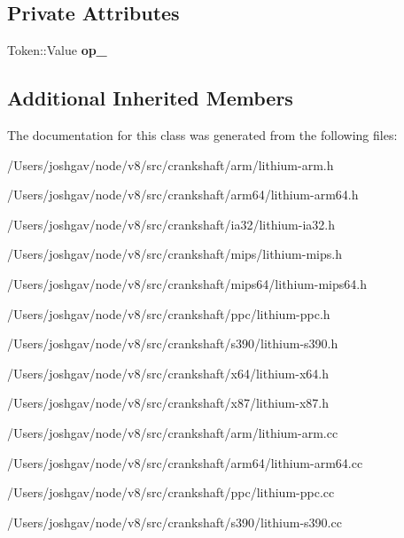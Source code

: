 \subsection*{Private Attributes}
\begin{DoxyCompactItemize}
\item 
Token\+::\+Value {\bfseries op\+\_\+}\hypertarget{classv8_1_1internal_1_1_l_arithmetic_d_a50480ec743e9f2894fcec9a92517219c}{}\label{classv8_1_1internal_1_1_l_arithmetic_d_a50480ec743e9f2894fcec9a92517219c}

\end{DoxyCompactItemize}
\subsection*{Additional Inherited Members}


The documentation for this class was generated from the following files\+:\begin{DoxyCompactItemize}
\item 
/\+Users/joshgav/node/v8/src/crankshaft/arm/lithium-\/arm.\+h\item 
/\+Users/joshgav/node/v8/src/crankshaft/arm64/lithium-\/arm64.\+h\item 
/\+Users/joshgav/node/v8/src/crankshaft/ia32/lithium-\/ia32.\+h\item 
/\+Users/joshgav/node/v8/src/crankshaft/mips/lithium-\/mips.\+h\item 
/\+Users/joshgav/node/v8/src/crankshaft/mips64/lithium-\/mips64.\+h\item 
/\+Users/joshgav/node/v8/src/crankshaft/ppc/lithium-\/ppc.\+h\item 
/\+Users/joshgav/node/v8/src/crankshaft/s390/lithium-\/s390.\+h\item 
/\+Users/joshgav/node/v8/src/crankshaft/x64/lithium-\/x64.\+h\item 
/\+Users/joshgav/node/v8/src/crankshaft/x87/lithium-\/x87.\+h\item 
/\+Users/joshgav/node/v8/src/crankshaft/arm/lithium-\/arm.\+cc\item 
/\+Users/joshgav/node/v8/src/crankshaft/arm64/lithium-\/arm64.\+cc\item 
/\+Users/joshgav/node/v8/src/crankshaft/ppc/lithium-\/ppc.\+cc\item 
/\+Users/joshgav/node/v8/src/crankshaft/s390/lithium-\/s390.\+cc\end{DoxyCompactItemize}
